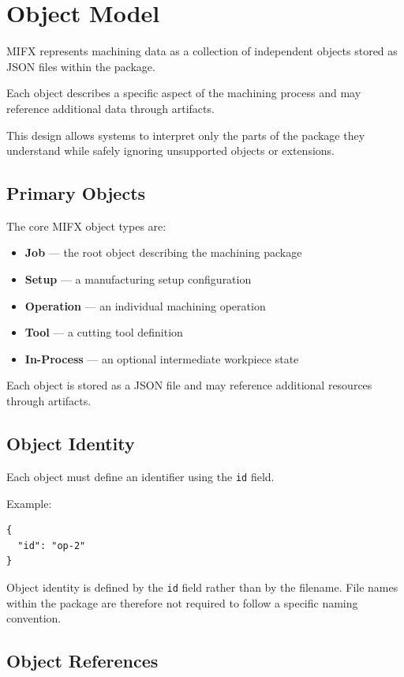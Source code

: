 \section{Object Model}

MIFX represents machining data as a collection of independent objects stored as JSON files within the package.

Each object describes a specific aspect of the machining process and may reference additional data through artifacts.

This design allows systems to interpret only the parts of the package they understand while safely ignoring unsupported objects or extensions.

\subsection{Primary Objects}

The core MIFX object types are:

\begin{itemize}
\item \textbf{Job} — the root object describing the machining package
\item \textbf{Setup} — a manufacturing setup configuration
\item \textbf{Operation} — an individual machining operation
\item \textbf{Tool} — a cutting tool definition
\item \textbf{In-Process} — an optional intermediate workpiece state
\end{itemize}

Each object is stored as a JSON file and may reference additional resources through artifacts.

\subsection{Object Identity}

Each object must define an identifier using the \texttt{id} field.

Example:

\begin{verbatim}
{
  "id": "op-2"
}
\end{verbatim}

Object identity is defined by the \texttt{id} field rather than by the filename.  
File names within the package are therefore not required to follow a specific naming convention.

\subsection{Object References}

